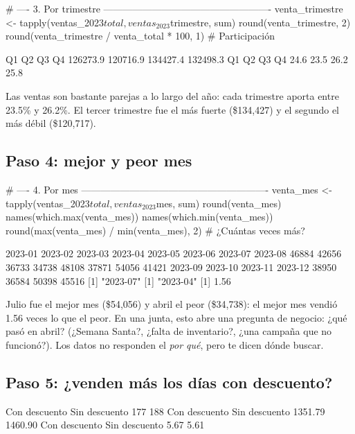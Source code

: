 \begin{rcode}
# ---- 3. Por trimestre ----------------------------------------------------
venta_trimestre <- tapply(ventas_2023$total, ventas_2023$trimestre, sum)
round(venta_trimestre, 2)
round(venta_trimestre / venta_total * 100, 1)     # Participación %
\end{rcode}
\begin{rsalida}
      Q1       Q2       Q3       Q4 
126273.9 120716.9 134427.4 132498.3 
  Q1   Q2   Q3   Q4 
24.6 23.5 26.2 25.8 
\end{rsalida}

Las ventas son bastante parejas a lo largo del año: cada trimestre aporta
entre 23.5\% y 26.2\%. El tercer trimestre fue el más fuerte (\$134,427) y
el segundo el más débil (\$120,717).

\subsection{Paso 4: mejor y peor mes}

\begin{rcode}
# ---- 4. Por mes ----------------------------------------------------------
venta_mes <- tapply(ventas_2023$total, ventas_2023$mes, sum)
round(venta_mes)
names(which.max(venta_mes))
names(which.min(venta_mes))
round(max(venta_mes) / min(venta_mes), 2)   # ¿Cuántas veces más?
\end{rcode}
\begin{rsalida}
2023-01 2023-02 2023-03 2023-04 2023-05 2023-06 2023-07 2023-08 
  46884   42656   36733   34738   48108   37871   54056   41421 
2023-09 2023-10 2023-11 2023-12 
  38950   36584   50398   45516 
[1] "2023-07"
[1] "2023-04"
[1] 1.56
\end{rsalida}

Julio fue el mejor mes (\$54,056) y abril el peor (\$34,738): el mejor mes
vendió 1.56 veces lo que el peor. En una junta, esto abre una pregunta de
negocio: ¿qué pasó en abril? (¿Semana Santa?, ¿falta de inventario?, ¿una
campaña que no funcionó?). Los datos no responden el \emph{por qué}, pero
te dicen dónde buscar.

\subsection{Paso 5: ¿venden más los días con descuento?}

\begin{rsalida}

Con descuento Sin descuento 
          177           188 
Con descuento Sin descuento 
      1351.79       1460.90 
Con descuento Sin descuento 
         5.67          5.61 
\end{rsalida}

